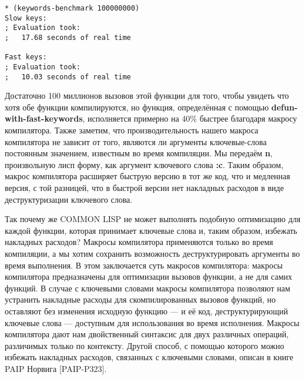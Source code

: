 \begin{verbatim}
* (keywords-benchmark 100000000)
Slow keys:
; Evaluation took:
;   17.68 seconds of real time

Fast keys:
; Evaluation took:
;   10.03 seconds of real time 
\end{verbatim}

Достаточно 100 миллионов вызовов этой функции для того, чтобы увидеть что хотя обе функции компилируются, но функция, определённая с помощью \textbf{defun-with-fast-keywords}, исполняется примерно на 40\% быстрее благодаря макросу компилятора. Также заметим, что производительность нашего макроса компилятора не зависит от того, являются ли аргументы ключевые-слова постоянным значением, известным во время компиляции. Мы передаём \textbf{n}, произвольную лисп форму, как аргумент ключевого слова \textbf{:c}. Таким образом, макрос компилятора расширяет быструю версию в тот же код, что и медленная версия, с той разницей, что в быстрой версии нет накладных расходов в виде деструктуризации ключевого слова.

Так почему же COMMON LISP не может выполнять подобную оптимизацию для каждой функции, которая принимает ключевые слова и, таким образом, избежать накладных расходов? Макросы компилятора применяются только во время компиляции, а мы хотим сохранить возможность деструктурировать аргументы во время выполнения. В этом заключается суть макросов компилятора: макросы компилятора предназначены для оптимизации вызовов функции, а не для самих функций. В случае с ключевыми словами макросы компилятора позволяют нам устранить накладные расходы для скомпилированных вызовов функций, но оставляют без изменения исходную функцию --- и её код, деструктурирующий ключевые слова --- доступным для использования во время исполнения. Макросы компилятора дают нам двойственный синтаксис для двух различных операций, различимых только по контексту. Другой способ, с помощью которого можно избежать накладных расходов, связанных с ключевыми словами, описан в книге PAIP Норвига [PAIP-P323].

